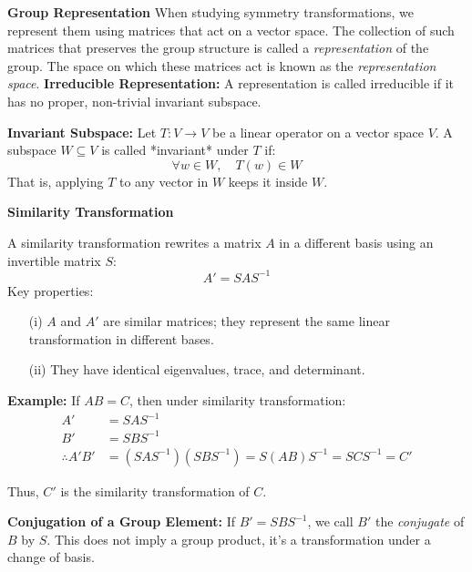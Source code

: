 \documentclass[14pt]{article} %
\begin{document}
\begin{tcolorbox}[ title=\textbf{Notes:}]
\textbf{Group Representation}
\vspace{0.1cm}
\newline
When studying symmetry transformations, we represent them using matrices that act on a vector space.  
The collection of such matrices that preserves the group structure is called a \textit{representation} of the group.  
The space on which these matrices act is known as the \textit{representation space}.
\vspace{0.1cm}
\newline
\textbf{Irreducible Representation:}  
A representation is called irreducible if it has no proper, non-trivial invariant subspace.

\vspace{0.1cm}
\textbf{Invariant Subspace:}  
Let $T: V \rightarrow V$ be a linear operator on a vector space $V$. A subspace $W \subseteq V$ is called *invariant* under $T$ if:
\[
\forall w \in W,\quad T(w) \in W
\]
That is, applying $T$ to any vector in $W$ keeps it inside $W$.

\vspace{0.3cm}
\textbf{Similarity Transformation}

A similarity transformation rewrites a matrix $A$ in a different basis using an invertible matrix $S$:
\[
A' = S A S^{-1}
\]
Key properties:
\begin{itemize}
    \item[(i)] $A$ and $A'$ are similar matrices; they represent the same linear transformation in different bases.
    \item[(ii)] They have identical eigenvalues, trace, and determinant.
\end{itemize}

\textbf{Example:} If $AB = C$, then under similarity transformation:
\begin{align*}
A'& =SAS^{-1} \\
B' &= SBS^{-1} \\
    \therefore A'B' &= (SAS^{-1})(SBS^{-1}) = S(AB)S^{-1} = SCS^{-1} = C'
\end{align*}

Thus, $C'$ is the similarity transformation of $C$.
\vspace{0.3cm}

\textbf{Conjugation of a Group Element:}
\newline
If $B' = SBS^{-1}$, we call $B'$ the \textit{conjugate} of $B$ by $S$.
This does not imply a group product, it’s a transformation under a change of basis.
\end{tcolorbox}
\end{document}
